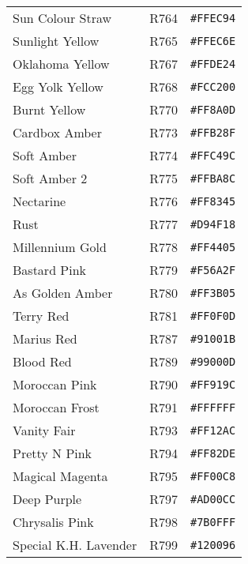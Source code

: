 \documentclass[a4paper]{article}
\begin{document}
\begin{longtable}{|l|l|r|}
Sun Colour Straw & R764 & \texttt{\#FFEC94} \cellcolor[HTML]{FFEC94} \\
Sunlight Yellow & R765 & \texttt{\#FFEC6E} \cellcolor[HTML]{FFEC6E} \\
Oklahoma Yellow & R767 & \texttt{\#FFDE24} \cellcolor[HTML]{FFDE24} \\
Egg Yolk Yellow & R768 & \texttt{\#FCC200} \cellcolor[HTML]{FCC200} \\
Burnt Yellow & R770 & \texttt{\#FF8A0D} \cellcolor[HTML]{FF8A0D} \\
Cardbox Amber & R773 & \texttt{\#FFB28F} \cellcolor[HTML]{FFB28F} \\
Soft Amber & R774 & \texttt{\#FFC49C} \cellcolor[HTML]{FFC49C} \\
Soft Amber 2 & R775 & \texttt{\#FFBA8C} \cellcolor[HTML]{FFBA8C} \\
Nectarine & R776 & \texttt{\#FF8345} \cellcolor[HTML]{FF8345} \\
Rust & R777 & \texttt{\#D94F18} \cellcolor[HTML]{D94F18} \\
Millennium Gold & R778 & \texttt{\#FF4405} \cellcolor[HTML]{FF4405} \\
Bastard Pink & R779 & \texttt{\#F56A2F} \cellcolor[HTML]{F56A2F} \\
As Golden Amber & R780 & \texttt{\#FF3B05} \cellcolor[HTML]{FF3B05} \\
Terry Red & R781 & \texttt{\#FF0F0D} \cellcolor[HTML]{FF0F0D} \\
Marius Red & R787 & \texttt{\#91001B} \cellcolor[HTML]{91001B} \\
Blood Red & R789 & \texttt{\#99000D} \cellcolor[HTML]{99000D} \\
Moroccan Pink & R790 & \texttt{\#FF919C} \cellcolor[HTML]{FF919C} \\
Moroccan Frost & R791 & \texttt{\#FFFFFF} \cellcolor[HTML]{FFFFFF} \\
Vanity Fair & R793 & \texttt{\#FF12AC} \cellcolor[HTML]{FF12AC} \\
Pretty N Pink & R794 & \texttt{\#FF82DE} \cellcolor[HTML]{FF82DE} \\
Magical Magenta & R795 & \texttt{\#FF00C8} \cellcolor[HTML]{FF00C8} \\
Deep Purple & R797 & \texttt{\#AD00CC} \cellcolor[HTML]{AD00CC} \\
Chrysalis Pink & R798 & \texttt{\#7B0FFF} \cellcolor[HTML]{7B0FFF} \\
Special K.H. Lavender & R799 & \texttt{\#120096} \cellcolor[HTML]{120096} \\

\end{longtable}
\end{document}
